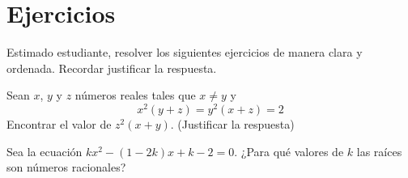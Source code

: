 \section*{\large Ejercicios}

Estimado estudiante, resolver los siguientes ejercicios de manera clara y ordenada. Recordar justificar la respuesta.

\begin{exercise}
    Sean $x$, $y$ y $z$ números reales tales que $x\neq y$ y
    \[x^2(y + z) = y^2(x + z) = 2\]
    Encontrar el valor de $z^2(x + y)$. (Justificar la respuesta)
\end{exercise}

\begin{exercise}
    Sea la ecuación $kx^2 - (1 - 2k)x + k - 2 = 0$.
    ¿Para qué valores de $k$ las raíces son números racionales?
\end{exercise}